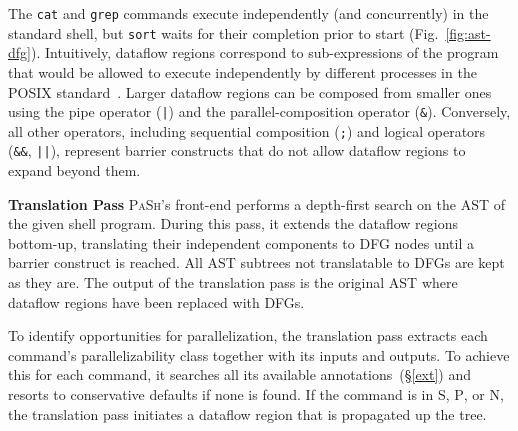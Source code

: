 \documentclass[sigplan, review, screen, anonymous]{acmart}
\newcommand{\heading}[1]{\vspace{4pt}\noindent\textbf{#1}\enspace}
\newcommand{\ttt}[1]{\texttt{#1}}
\newcommand{\cn}[1]{\mbox{\textcircled{\footnotesize #1}}}
\newcommand{\sta}{\cn{\textsc{S}}\xspace}
\newcommand{\pur}{\cn{\textsc{P}}\xspace}
\newcommand{\npu}{\cn{\textsc{N}}\xspace}
\newcommand{\kk}[1]{[{\color{magenta}kk: #1}]}
\newcommand{\tr}[1]{} %
\newcommand{\sx}[1]{(\S\ref{#1})}
\newcommand{\sys}{{\scshape PaSh}\xspace}
\begin{document}
\noindent
The \ttt{cat} and \ttt{grep} commands execute independently (and concurrently)
in the standard shell, but \ttt{sort} waits for their completion prior to start
(Fig.~\ref{fig:ast-dfg}).
% 
Intuitively, dataflow regions correspond to sub-expressions of
the program that would be allowed to execute independently by
different processes in the POSIX standard~\cite{posix}. Larger
dataflow regions can be composed from smaller ones using the
pipe operator (\ttt{|}) and the parallel-composition operator (\ttt{&}).
Conversely, all other operators, including sequential composition (\ttt{;}) and logical operators (\ttt{&&}, \ttt{||}), represent
barrier constructs that do not allow dataflow regions to expand beyond them.

% 
% 
% 

\heading{Translation Pass}
%
%
\sys's front-end performs a depth-first search on the AST of
the given shell program.  During this pass, it extends the
dataflow regions bottom-up, translating their
independent components to DFG nodes until a barrier
construct is reached. All AST subtrees not translatable to DFGs are kept as they are. The output of the translation pass is the
original AST where dataflow regions have been replaced with
DFGs. 

To identify opportunities for parallelization, the translation pass extracts each command's  parallelizability class together with its inputs and outputs.
To achieve this for each command, it searches all its available annotations~\sx{ext} and resorts to conservative defaults if none is found.
If the command is in \sta, \pur, or \npu, the translation pass initiates a dataflow region that is propagated up the tree.
\end{document}
